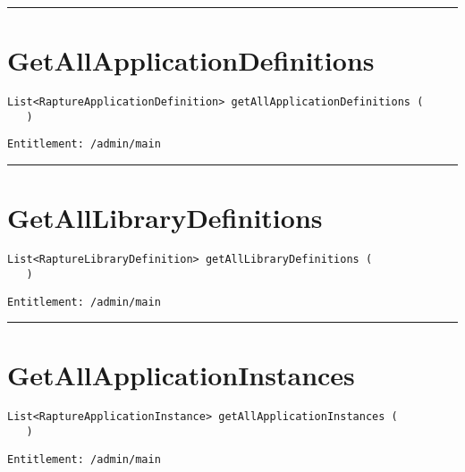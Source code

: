\rule{12cm}{2pt}
\section{GetAllApplicationDefinitions}
\label{Api:GetAllApplicationDefinitions}
\begin{lstlisting}[style=nonumbers]
   List<RaptureApplicationDefinition> getAllApplicationDefinitions (
   )
\end{lstlisting}
\begin{Verbatim}[formatcom=\color{Maroon}]
  Entitlement: /admin/main
\end{Verbatim}



\rule{12cm}{2pt}
\section{GetAllLibraryDefinitions}
\label{Api:GetAllLibraryDefinitions}
\begin{lstlisting}[style=nonumbers]
   List<RaptureLibraryDefinition> getAllLibraryDefinitions (
   )
\end{lstlisting}
\begin{Verbatim}[formatcom=\color{Maroon}]
  Entitlement: /admin/main
\end{Verbatim}



\rule{12cm}{2pt}
\section{GetAllApplicationInstances}
\label{Api:GetAllApplicationInstances}
\begin{lstlisting}[style=nonumbers]
   List<RaptureApplicationInstance> getAllApplicationInstances (
   )
\end{lstlisting}
\begin{Verbatim}[formatcom=\color{Maroon}]
  Entitlement: /admin/main
\end{Verbatim}



